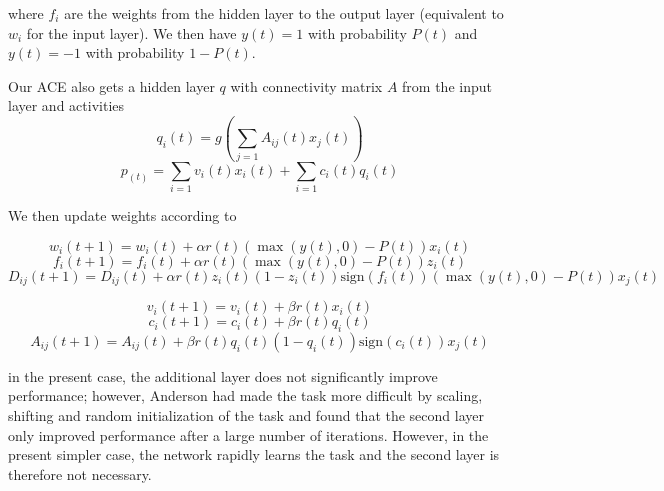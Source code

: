 \documentclass{article}
\begin{document}
where $f_i$ are the weights from the hidden layer to the output layer (equivalent to $w_i$ for the input layer).
We then have $y(t) = 1$ with probability $P(t)$ and $y(t) = -1$ with probability $1-P(t)$.

Our ACE also gets a hidden layer  $q$ with connectivity matrix $A$ from the input layer and activities
\begin{equation}
q_i(t) = g(\sum_{j=1}{A_{ij}(t) x_j(t)})
\end{equation}
\begin{equation}
p_(t) = \sum_{i=1}{v_{i}(t) x_i(t)} + \sum_{i=1}{c_i(t)q_i(t)}
\end{equation}

We then update weights according to

\begin{equation}
w_i(t+1) = w_i(t) + \alpha r(t)(\max{(y(t), 0)} - P(t))x_i(t)
\end{equation}
\begin{equation}
f_i(t+1) = f_i(t) + \alpha r(t)(\max{(y(t), 0)} - P(t))z_i(t)
\end{equation}
\begin{equation}
D_{ij}(t+1) = D_{ij}(t) + \alpha r(t) z_i(t) (1-z_i(t))\text{sign}(f_i(t)) (\max{(y(t), 0)} - P(t))x_j(t)
\end{equation}


\begin{equation}
v_i(t+1) = v_i(t) + \beta r(t) x_i(t)
\end{equation}
\begin{equation}
c_i(t+1) = c_i(t) + \beta r(t) q_i(t)
\end{equation}
\begin{equation}
A_{ij}(t+1) = A_{ij}(t) + \beta r(t) q_i(t) (1-q_i(t))\text{sign}(c_i(t)) x_j(t)
\end{equation}






in the present case, the additional layer does not significantly improve performance; however, Anderson had made the task more difficult by scaling, shifting and random initialization of the task and found that the second layer only improved performance after a large number of iterations. However, in the present simpler case, the network rapidly learns the task and the second layer is therefore not necessary.
\end{document}
